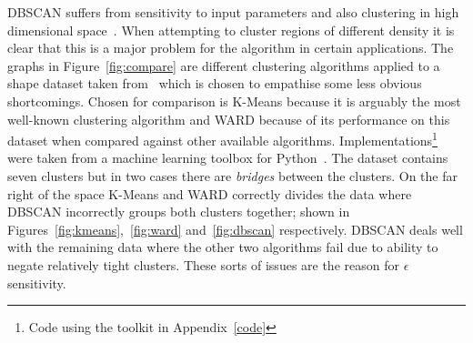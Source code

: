 \documentclass{ecsarticle}     %
\begin{document}
DBSCAN suffers from sensitivity to input parameters and also clustering in high dimensional space~\citep{han01survey}.
When attempting to cluster regions of different density it is clear that this is a major problem for the algorithm in certain applications. 
The graphs in Figure~\ref{fig:compare} are different clustering algorithms applied to a shape dataset taken from~\cite{gionis05cluster} which is chosen to empathise some less obvious shortcomings.
Chosen for comparison is K-Means because it is arguably the most well-known clustering algorithm and WARD because of its performance on this dataset when compared against other available algorithms.
Implementations\footnote{Code using the toolkit in Appendix~\ref{code}} were taken from a machine learning toolbox for Python~\citep{scikit13ml}.
The dataset contains seven clusters but in two cases there are \emph{bridges} between the clusters.
On the far right of the space K-Means and WARD correctly divides the data where DBSCAN incorrectly groups both clusters together; shown in Figures~\ref{fig:kmeans},~\ref{fig:ward} and~\ref{fig:dbscan} respectively.
DBSCAN deals well with the remaining data where the other two algorithms fail due to ability to negate relatively tight clusters.
These sorts of issues are the reason for $\epsilon$ sensitivity. 
\end{document}
